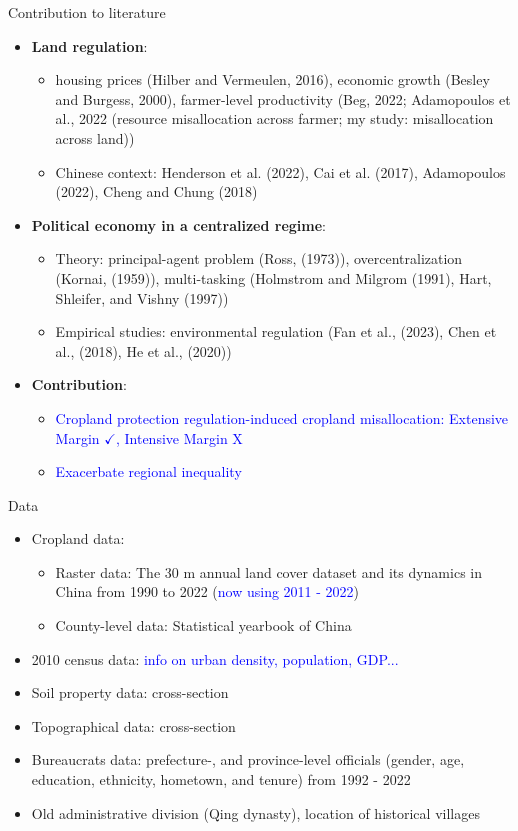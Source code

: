 \documentclass[10pt, xcolor=x11names,compress, aspectratio=169]{beamer}
\begin{document}
\begin{frame}{Contribution to literature}
\begin{itemize}
    \item \textbf{Land regulation}: 
    \begin{itemize}
    \item housing prices (Hilber and Vermeulen, 2016), economic growth (Besley and Burgess, 2000), farmer-level productivity (Beg, 2022; Adamopoulos et al., 2022 (resource misallocation across farmer; my study: misallocation across land))
    \item Chinese context: Henderson et al. (2022), Cai et al. (2017), Adamopoulos (2022), Cheng and Chung (2018)
    \end{itemize}
    \item \textbf{Political economy in a centralized regime}: 
    \begin{itemize}
        \item Theory: principal-agent problem (Ross, (1973)), overcentralization (Kornai, (1959)), multi-tasking (Holmstrom and Milgrom (1991), Hart, Shleifer, and Vishny (1997))  
        \item Empirical studies: environmental regulation (Fan et al., (2023), Chen et al., (2018), He et al., (2020))
    \end{itemize}
    \item \textbf{Contribution}: 
    \begin{itemize}
        \item \textcolor{blue}{Cropland protection regulation-induced cropland misallocation: Extensive Margin $\checkmark$, Intensive Margin X}
        \item \textcolor{blue}{Exacerbate regional inequality}
    \end{itemize}
\end{itemize}
\end{frame}

\begin{frame}{Data}
\begin{itemize}
    \item Cropland data:
    \begin{itemize}
        \item Raster data: The 30 m annual land cover dataset and its dynamics in China from 1990 to 2022 (\textcolor{blue}{now using 2011 - 2022})
        \item County-level data: Statistical yearbook of China
    \end{itemize}
    \item 2010 census data: \textcolor{blue}{info on urban density, population, GDP...}
    \item Soil property data: cross-section
    \item Topographical data: cross-section
    \item Bureaucrats data: prefecture-, and province-level officials (gender, age, education, ethnicity, hometown, and tenure) from 1992 - 2022
    \item Old administrative division (Qing dynasty), location of historical villages
\end{itemize}
\end{frame}
\end{document}
